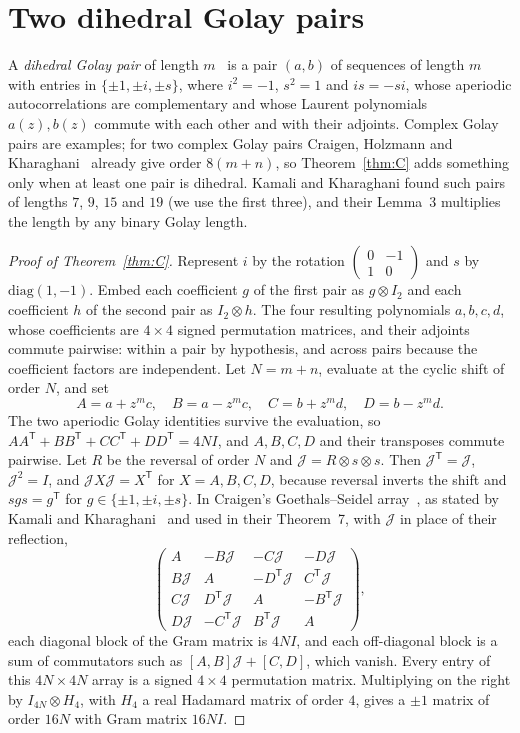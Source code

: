 \documentclass[10pt]{article}
\theoremstyle{remark}
\newcommand{\tr}{^{\mathsf T}}
\begin{document}
\section{Two dihedral Golay pairs}\label{sec:golay}
A \emph{dihedral Golay pair} of length $m$~\cite{KK98} is a pair $(a,b)$ of sequences of length $m$ with entries in $\{\pm1,\pm i,\pm s\}$, where $i^2=-1$, $s^2=1$ and $is=-si$, whose aperiodic autocorrelations are complementary and whose Laurent polynomials $a(z),b(z)$ commute with each other and with their adjoints. Complex Golay pairs are examples; for two complex Golay pairs Craigen, Holzmann and Kharaghani~\cite{CHK02} already give order $8(m+n)$, so Theorem~\ref{thm:C} adds something only when at least one pair is dihedral. Kamali and Kharaghani found such pairs of lengths $7$, $9$, $15$ and $19$ (we use the first three), and their Lemma~3 multiplies the length by any binary Golay length.

\begin{proof}[Proof of Theorem~\ref{thm:C}]
Represent $i$ by the rotation $\left(\begin{smallmatrix}0&-1\\1&0\end{smallmatrix}\right)$ and $s$ by $\mathrm{diag}(1,-1)$. Embed each coefficient $g$ of the first pair as $g\otimes I_2$ and each coefficient $h$ of the second pair as $I_2\otimes h$. The four resulting polynomials $a,b,c,d$, whose coefficients are $4\times4$ signed permutation matrices, and their adjoints commute pairwise: within a pair by hypothesis, and across pairs because the coefficient factors are independent. Let $N=m+n$, evaluate at the cyclic shift of order $N$, and set
\[
A=a+z^mc,\quad B=a-z^mc,\quad C=b+z^md,\quad D=b-z^md .
\]
The two aperiodic Golay identities survive the evaluation, so $AA\tr+BB\tr+CC\tr+DD\tr=4NI$, and $A,B,C,D$ and their transposes commute pairwise. Let $R$ be the reversal of order $N$ and $\mathcal J=R\otimes s\otimes s$. Then $\mathcal J\tr=\mathcal J$, $\mathcal J^2=I$, and $\mathcal JX\mathcal J=X\tr$ for $X=A,B,C,D$, because reversal inverts the shift and $sgs=g\tr$ for $g\in\{\pm1,\pm i,\pm s\}$. In Craigen's Goethals--Seidel array~\cite{Cr94}, as stated by Kamali and Kharaghani~\cite[Lemma~2]{KK98} and used in their Theorem~7, with $\mathcal J$ in place of their reflection,
\[
\begin{pmatrix}
A&-B\mathcal J&-C\mathcal J&-D\mathcal J\\
B\mathcal J&A&-D\tr\mathcal J&C\tr\mathcal J\\
C\mathcal J&D\tr\mathcal J&A&-B\tr\mathcal J\\
D\mathcal J&-C\tr\mathcal J&B\tr\mathcal J&A
\end{pmatrix},
\]
each diagonal block of the Gram matrix is $4NI$, and each off-diagonal block is a sum of commutators such as $[A,B]\mathcal J+[C,D]$, which vanish. Every entry of this $4N\times4N$ array is a signed $4\times4$ permutation matrix. Multiplying on the right by $I_{4N}\otimes H_4$, with $H_4$ a real Hadamard matrix of order $4$, gives a $\pm1$ matrix of order $16N$ with Gram matrix $16NI$.
\end{proof}
\end{document}
